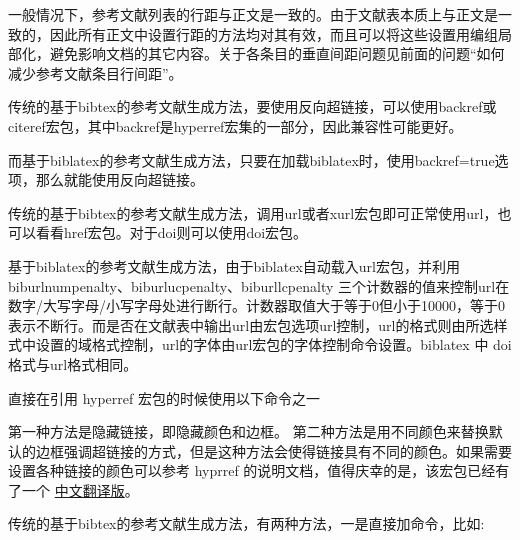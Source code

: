
一般情况下，参考文献列表的行距与正文是一致的。由于文献表本质上与正文是一致的，因此所有正文中设置行距的方法均对其有效，而且可以将这些设置用编组局部化，避免影响文档的其它内容。关于各条目的垂直间距问题见前面的问题“如何减少参考文献条目行间距”。





传统的基于bibtex的参考文献生成方法，要使用反向超链接，可以使用backref或citeref宏包，其中backref是hyperref宏集的一部分，因此兼容性可能更好。

而基于biblatex的参考文献生成方法，只要在加载biblatex时，使用backref=true选项，那么就能使用反向超链接。



传统的基于bibtex的参考文献生成方法，调用url或者xurl宏包即可正常使用url，也可以看看href宏包。对于doi则可以使用doi宏包。

基于biblatex的参考文献生成方法，由于biblatex自动载入url宏包，并利用biburlnumpenalty、biburlucpenalty、biburllcpenalty 三个计数器的值来控制url在数字/大写字母/小写字母处进行断行。计数器取值大于等于0但小于10000，等于0表示不断行。而是否在文献表中输出url由宏包选项url控制，url的格式则由所选样式中设置的域格式控制，url的字体由url宏包的字体控制命令设置。biblatex 中 doi格式与url格式相同。




直接在引用 hyperref 宏包的时候使用以下命令之一

\begin{texlist}
\usepackage[hidelinks]{hyperref}
\usepackage[colorlinks]{hyperref}
\end{texlist}

第一种方法是隐藏链接，即隐藏颜色和边框。
第二种方法是用不同颜色来替换默认的边框强调超链接的方式，但是这种方法会使得链接具有不同的颜色。如果需要设置各种链接的颜色可以参考
hyprref
的说明文档，值得庆幸的是，该宏包已经有了一个
\href{https://github.com/latexstudio/LaTeXPackages-CN/blob/master/hyperref/hyperref-zh-cn.pdf}{中文翻译版}。




传统的基于bibtex的参考文献生成方法，有两种方法，一是直接加命令，比如:

\begin{texlist}
{
\small


}
\end{texlist}

